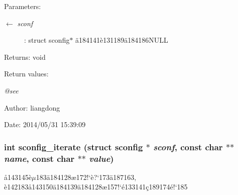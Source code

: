 \begin{Desc}
\item[Parameters:]
\begin{description}
\item[\mbox{$\leftarrow$} {\em sconf}]: struct sconfig$\ast$ \"{a}184141\`{e}131189\"{a}184186NULL \end{description}
\end{Desc}
\begin{Desc}
\item[Returns:]void \end{Desc}
\begin{Desc}
\item[Return values:]
\begin{description}
\item[{\em @see}]\end{description}
\end{Desc}
\begin{Desc}
\item[Author:]liangdong \end{Desc}
\begin{Desc}
\item[Date:]2014/05/31 15:39:09 \end{Desc}
\subsubsection{\setlength{\rightskip}{0pt plus 5cm}int sconfig\_\-iterate (struct sconfig $\ast$ {\em sconf}, const char $\ast$$\ast$ {\em name}, const char $\ast$$\ast$ {\em value})}\label{sconfig_8c_a13}


\aa{}143145\`{e}$\mu$183\"{a}184128\ae{}172!`\`{e}?`173\"{a}187163, \`{e}142183\aa{}143150\"{a}184139\"{a}184128\ae{}157!`\'{e}133141\c{c}189174\'{e}!`185 

